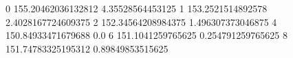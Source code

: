 0 155.20462036132812 4.35528564453125
1 153.2521514892578 2.4028167724609375
2 152.34564208984375 1.496307373046875
4 150.84933471679688 0.0
6 151.1041259765625 0.254791259765625
8 151.74783325195312 0.89849853515625
